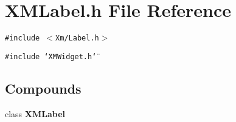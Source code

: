 \section{XMLabel.h File Reference}
\label{XMLabel_8h}
{\tt \#include $<$Xm/Label.h$>$}\par
{\tt \#include \char`\"{}XMWidget.h\char`\"{}}\par
\subsection*{Compounds}
\begin{CompactItemize}
\item 
class {\bf XMLabel}
\end{CompactItemize}
